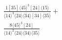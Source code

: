 \documentclass[varwidth, border=5pt]{standalone}
\begin{document}
\begin{my}
$\begin{gathered}
\scriptscriptstyle\frac{1[35]⟨45⟩^3[24]⟨15⟩}{⟨14⟩^3⟨24⟩⟨34⟩[34]⟨35⟩}+\\
\scriptscriptstyle\frac{8⟨45⟩^3[24]}{⟨14⟩^2⟨24⟩⟨34⟩⟨35⟩}\phantom{+}
\end{gathered}$
\end{my}
\end{document}
